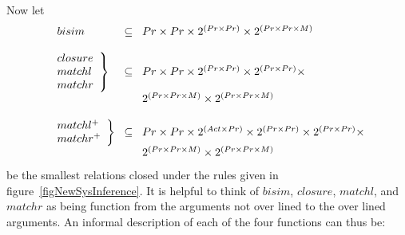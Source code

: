 Now let
\[
\begin{array}{l@{\;\;\;}c@{\;\;\;}l}
\left.\begin{array}{l}bisim\end{array}\right.    & \subseteq & Pr\times Pr\times 2^{(Pr\times Pr)}\times 2^{(Pr\times Pr\times M)}\\
\\
\left.\begin{array}{l}closure\\ matchl\\ matchr\end{array}\right\}
         & \subseteq & Pr\times Pr\times 2^{(Pr\times Pr)}\times 2^{(Pr\times Pr)}\times\\
&& 2^{(Pr\times Pr\times M)}\times 2^{(Pr\times Pr\times M)}\\
\\
\left.\begin{array}{l}matchl^{+}\\ matchr^{+}\end{array}\right\}
         & \subseteq & Pr\times Pr\times 2^{(Act\times Pr)}\times 2^{(Pr\times Pr)}\times 2^{(Pr\times Pr)}\times\\
&& 2^{(Pr\times Pr\times M)}\times 2^{(Pr\times Pr\times M)}\\
\end{array}
\]
be the smallest relations closed under the rules given in figure~\ref{figNewSysInference}. It is helpful to think of $bisim$, $closure$, $matchl$, and $matchr$ as being function from the arguments not over lined to the over lined arguments. An informal description of each of the four functions can thus be:
